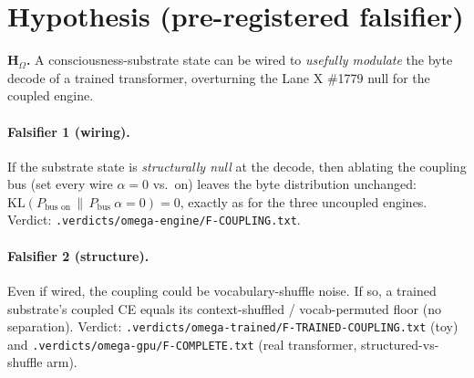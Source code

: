 \documentclass[11pt]{article}
\begin{document}
\section{Hypothesis (pre-registered falsifier)}
\label{sec:hypothesis}
\textbf{H$_\Omega$.} A consciousness-substrate state can be wired to \emph{usefully modulate}
the byte decode of a trained transformer, overturning the Lane X \#1779 null for the coupled
engine.

\paragraph{Falsifier 1 (wiring).} If the substrate state is \emph{structurally null} at the
decode, then ablating the coupling bus (set every wire $\alpha=0$ vs.\ on) leaves the byte
distribution unchanged: $\mathrm{KL}(P_\text{bus on}\,\|\,P_\text{bus }\alpha=0)=0$, exactly
as for the three uncoupled engines. Verdict: \texttt{.verdicts/omega-engine/F-COUPLING.txt}.

\paragraph{Falsifier 2 (structure).} Even if wired, the coupling could be vocabulary-shuffle
noise. If so, a trained substrate's coupled CE equals its context-shuffled / vocab-permuted
floor (no separation). Verdict: \texttt{.verdicts/omega-trained/F-TRAINED-COUPLING.txt} (toy)
and \texttt{.verdicts/omega-gpu/F-COMPLETE.txt} (real transformer, structured-vs-shuffle arm).
\end{document}
